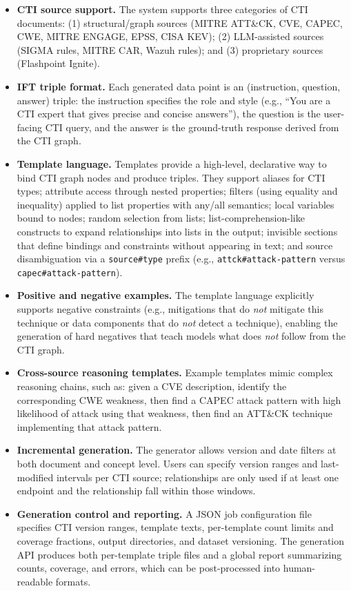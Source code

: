 \documentclass[sigconf]{acmart}
\begin{document}
\begin{itemize}
  \item \textbf{CTI source support.} The system supports three categories of CTI documents: (1) structural/graph sources (MITRE ATT\&CK, CVE, CAPEC, CWE, MITRE ENGAGE, EPSS, CISA KEV); (2) LLM-assisted sources (SIGMA rules, MITRE CAR, Wazuh rules); and (3) proprietary sources (Flashpoint Ignite).
  \item \textbf{IFT triple format.} Each generated data point is an (instruction, question, answer) triple: the instruction specifies the role and style (e.g., ``You are a CTI expert that gives precise and concise answers''), the question is the user-facing CTI query, and the answer is the ground-truth response derived from the CTI graph.
  \item \textbf{Template language.} Templates provide a high-level, declarative way to bind CTI graph nodes and produce triples. They support aliases for CTI types; attribute access through nested properties; filters (using equality and inequality) applied to list properties with any/all semantics; local variables bound to nodes; random selection from lists; list-comprehension-like constructs to expand relationships into lists in the output; invisible sections that define bindings and constraints without appearing in text; and source disambiguation via a \verb|source#type| prefix (e.g., \verb|attck#attack-pattern| versus \verb|capec#attack-pattern|).\cite{cardei2025ift}
  \item \textbf{Positive and negative examples.} The template language explicitly supports negative constraints (e.g., mitigations that do \emph{not} mitigate this technique or data components that do \emph{not} detect a technique), enabling the generation of hard negatives that teach models what does \emph{not} follow from the CTI graph.
  \item \textbf{Cross-source reasoning templates.} Example templates mimic complex reasoning chains, such as: given a CVE description, identify the corresponding CWE weakness, then find a CAPEC attack pattern with high likelihood of attack using that weakness, then find an ATT\&CK technique implementing that attack pattern.
  \item \textbf{Incremental generation.} The generator allows version and date filters at both document and concept level. Users can specify version ranges and last-modified intervals per CTI source; relationships are only used if at least one endpoint and the relationship fall within those windows.
  \item \textbf{Generation control and reporting.} A JSON job configuration file specifies CTI version ranges, template texts, per-template count limits and coverage fractions, output directories, and dataset versioning. The generation API produces both per-template triple files and a global report summarizing counts, coverage, and errors, which can be post-processed into human-readable formats.\cite{cardei2025ift}
\end{itemize}
\end{document}
